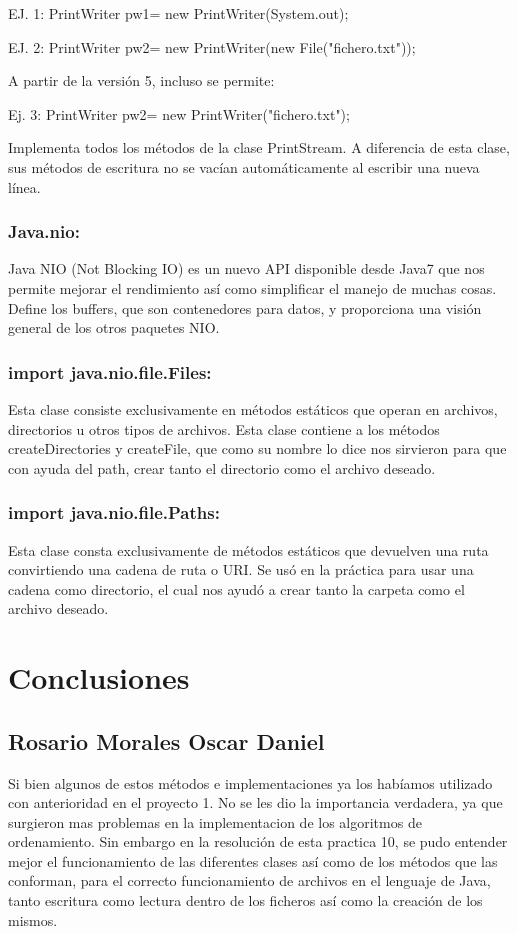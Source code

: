 \documentclass[12pt,letterpaper]{article}
\begin{document}
EJ. 1:   PrintWriter pw1= new PrintWriter(System.out);


EJ. 2:   PrintWriter pw2= new PrintWriter(new File("fichero.txt"));


A partir de la versión 5, incluso se permite:


Ej. 3:    PrintWriter pw2= new PrintWriter("fichero.txt");


Implementa todos los métodos de la clase PrintStream. A diferencia de esta clase, sus métodos de escritura no se vacían automáticamente al escribir una nueva línea.

\subsubsection{Java.nio:}
 Java NIO (Not Blocking IO) es un nuevo API disponible desde Java7 que nos permite mejorar el rendimiento así como simplificar el manejo de muchas cosas.
Define los buffers, que son contenedores para datos, y proporciona una visión general de los otros paquetes NIO.

\subsubsection*{import java.nio.file.Files:}
Esta clase consiste exclusivamente en métodos estáticos que operan en archivos, directorios u otros tipos de archivos.
Esta clase contiene a los métodos createDirectories y createFile, que como su nombre lo dice nos sirvieron para que con ayuda del path, crear tanto el directorio como el archivo deseado.



\subsubsection*{import java.nio.file.Paths:}
Esta clase consta exclusivamente de métodos estáticos que devuelven una ruta convirtiendo una cadena de ruta o URI.
Se usó en la práctica para usar una cadena como directorio, el cual nos ayudó a crear tanto la carpeta como el archivo deseado.




\newpage
\section{Conclusiones}

\subsection*{Rosario Morales Oscar Daniel} 
Si bien algunos de estos métodos e implementaciones ya los habíamos utilizado con anterioridad en el proyecto 1. No se les dio la importancia verdadera, ya que surgieron mas problemas en la implementacion de los algoritmos de ordenamiento. Sin embargo en la resolución de esta practica 10, se pudo entender mejor el funcionamiento de las diferentes clases así como de los métodos que las conforman, para el correcto funcionamiento de archivos en el lenguaje de Java, tanto escritura como lectura dentro de los ficheros así como la creación de los mismos.
\end{document}
